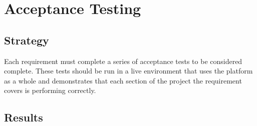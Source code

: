 \section{Acceptance Testing}

\subsection*{Strategy}

Each requirement must complete a series of acceptance tests to be considered complete. These tests should be run in a live environment that uses the platform as a whole and demonstrates that each section of the project the requirement covers is performing correctly.

\subsection*{Results}